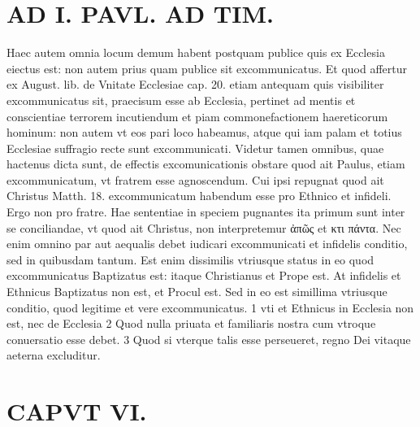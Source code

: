 \documentclass{article}
\begin{document}
\begin{pages}
\section*{AD I. PAVL. AD TIM. }
\marginpar{[ p.Reo. ]}\pstart Haec autem omnia locum demum habent postquam publice quis ex Ecclesia eiectus est: non autem prius quam publice sit excommunicatus. Et quod affertur ex August. lib.  de Vnitate Ecclesiae cap. 20. etiam antequam quis visibiliter excommunicatus sit, praecisum esse ab Ecclesia, pertinet ad mentis et conscientiae terrorem incutiendum et piam commonefactionem haereticorum hominum: non autem vt eos pari loco habeamus, atque qui iam palam et totius Ecclesiae suffragio recte sunt excommunicati. Videtur tamen omnibus, quae hactenus dicta sunt, de effectis excomunicationis obstare quod ait Paulus, etiam excommunicatum, vt fratrem esse agnoscendum. Cui ipsi repugnat quod ait Christus Matth. 18. excommunicatum habendum esse pro Ethnico et infideli. Ergo non pro fratre. Hae sententiae in speciem pugnantes ita primum sunt inter se conciliandae, vt quod ait Christus, non interpretemur ἀπῶς et κτι πάντα. Nec enim omnino par aut aequalis debet iudicari excommunicati et infidelis conditio, sed in quibusdam tantum. Est enim dissimilis vtriusque status in eo quod excommunicatus Baptizatus est: itaque Christianus et Prope est. At infidelis et Ethnicus Baptizatus non est, et Procul est. Sed in eo est simillima vtriusque conditio, quod legitime et vere excommunicatus. 1 vti et Ethnicus in Ecclesia non est, nec de Ecclesia 2 Quod nulla priuata et familiaris nostra cum vtroque conuersatio esse debet. 3 Quod si vterque talis esse perseueret, regno Dei vitaque aeterna excluditur.  \pend
\endnumbering
\section{CAPVT  VI. }
\beginnumbering
\marginpar{[ p.409 ]}\pstart {}
{}

\end{pages}
\end{document}
